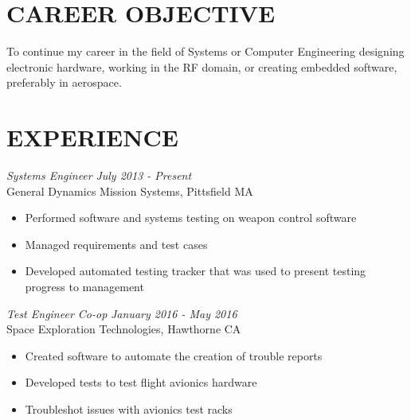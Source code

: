\documentclass[line,margin]{res}
\begin{document}
\setlength\columnsep{-30pt}
\address{56 South St.}
\address{Drury MA, 01343}
\website{}
 
\begin{resume}
 \setlength\multicolsep{2pt}

\section{CAREER OBJECTIVE}   
	To continue my career in the field of Systems or Computer Engineering designing electronic hardware, working in the RF domain, or creating embedded software, preferably in aerospace.
 
\section{EXPERIENCE} 
{\sl Systems Engineer} \hfill {\sl July 2013 - Present }\\
	General Dynamics Mission Systems, Pittsfield MA
	\begin{itemize}  \itemsep -2pt %
		\item Performed software and systems testing on weapon control software
		\item Managed requirements and test cases
		\item Developed automated testing tracker that was used to present testing progress to management
	\end{itemize}
	\vspace{-5pt}
{\sl  Test Engineer Co-op} \hfill {\sl January 2016 - May 2016}\\
	Space Exploration Technologies, Hawthorne CA
	\begin{itemize}  \itemsep -2pt %
		\item Created software to automate the creation of trouble reports
		\item Developed tests to test flight avionics hardware
		\item Troubleshot issues with avionics test racks
	\end{itemize}
 

\end{resume}
\end{document}
